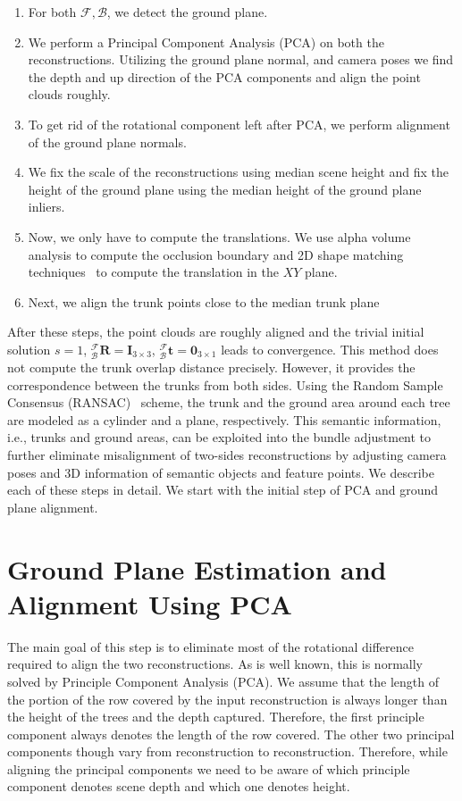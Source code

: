\begin{enumerate}
\item For both ${\mathcal{F}}, {\mathcal{B}}$, we detect the ground plane.
\item We perform a Principal Component Analysis (PCA) on both the reconstructions. Utilizing the ground plane normal, and camera poses we find the depth and up direction of the PCA components and align the point clouds roughly.
\item To get rid of the rotational component left after PCA, we perform alignment of the ground plane normals.
\item We fix the scale of the reconstructions using median scene height and fix the height of the ground plane using the median height of the ground plane inliers.
\item Now, we only have to compute the translations. We use alpha volume analysis to compute the occlusion boundary and 2D shape matching techniques~\cite{myronenko2010point} to compute the translation in the $XY$ plane.
\item Next, we align the trunk points  close to the median trunk plane
\end{enumerate}


After these steps, the point clouds are roughly aligned and the trivial initial solution $s = 1$, ${^{\mathcal{F}}_{\mathcal{B}}\mathbf{R}} = \mathbf{I}_{3\times 3}$, ${^{\mathcal{F}}_{\mathcal{B}}\mathbf{t}} = \mathbf{0}_{3\times 1}$ leads to convergence. This method does not compute the trunk overlap distance precisely. However, it provides the correspondence between the trunks from both sides.
Using the Random Sample Consensus (RANSAC)~\cite{yang2010plane} scheme, the trunk and the ground area around each tree are modeled as a cylinder and a plane, respectively. This semantic information, i.e., trunks and ground areas, can be exploited into the bundle adjustment to further eliminate misalignment of two-sides reconstructions by adjusting camera poses and 3D information of semantic objects and feature points. We describe each of these steps in detail. We start with the initial step of PCA and ground plane alignment.


\section{Ground Plane Estimation and Alignment Using PCA} \label{sec:pca}
The main goal of this step is to eliminate most of the rotational difference required to align the two reconstructions. As is well known, this is normally solved by Principle Component Analysis (PCA). We assume that the length of the portion of the row covered by the input reconstruction is always longer than the height of the trees and the depth captured. Therefore, the first principle component always denotes the length of the row covered. The other two principal components though vary from reconstruction to reconstruction. Therefore, while aligning the principal components we need to be aware of which principle component denotes scene depth and which one denotes height. 

